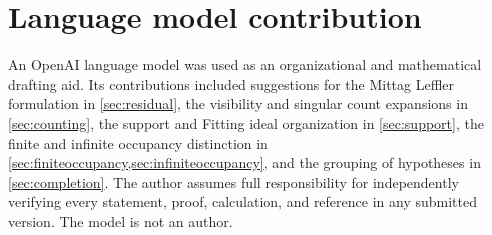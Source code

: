 \documentclass{aomart}
\theoremstyle{definition}
\theoremstyle{remark}
\begin{document}
\section*{Language model contribution}

An OpenAI language model was used as an organizational and mathematical drafting aid. Its contributions included suggestions for the Mittag Leffler formulation in \cref{sec:residual}, the visibility and singular count expansions in \cref{sec:counting}, the support and Fitting ideal organization in \cref{sec:support}, the finite and infinite occupancy distinction in \cref{sec:finiteoccupancy,sec:infiniteoccupancy}, and the grouping of hypotheses in \cref{sec:completion}. The author assumes full responsibility for independently verifying every statement, proof, calculation, and reference in any submitted version. The model is not an author.



\end{document}
